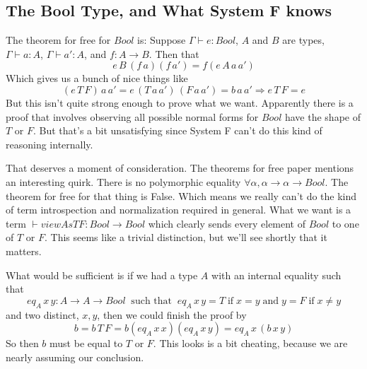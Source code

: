 \documentclass[12pt]{article}
\begin{document}
\subsection{The Bool Type, and What System F knows}
The theorem for free for $Bool$ is: Suppose $\Gamma \vdash e : Bool$, $A$ and $B$ are types, $\Gamma \vdash a : A$, $\Gamma \vdash a' : A$, and $f : A \rightarrow B$.
Then that 
\[
  e\, B\, (f\, a) (f\, a') = f (e\, A\, a\, a')
\]
Which gives us a bunch of nice things like
\[
(e\, T\, F)\, a\, a' = e\, (T\, a\, a')\, (F\, a\, a') = b\, a\, a' \Rightarrow e\, T\, F = e
\]
But this isn't quite strong enough to prove what we want.
Apparently there is a proof that involves observing all possible normal forms for $Bool$ have the shape of $T$ or $F$.
But that's a bit unsatisfying since System F can't do this kind of reasoning internally.

That deserves a moment of consideration.
The theorems for free paper mentions an interesting quirk.
There is no polymorphic equality $\forall \alpha, \alpha \rightarrow \alpha \rightarrow Bool$.
The theorem for free for that thing is False.
Which means we really can't do the kind of term introspection and normalization required in general. 
What we want is a term $\vdash viewAsTF : Bool \rightarrow Bool$ which clearly sends every element of $Bool$ to one of $T$ or $F$. 
This seems like a trivial distinction, but we'll see shortly that it matters.

What would be sufficient is if we had a type $A$ with an internal equality such that  
\[
  eq_A\, x\, y : A \rightarrow A \rightarrow Bool \;\;\text{such that}\;\; eq_A\, x\, y = T \;\text{if}\; x = y \;\text{and}\;  y = F \;\text{if}\; x \neq y
\]
and two distinct, $x, y$, then we could finish the proof by
\[
  b = b\, T\, F = b (eq_A\, x\, x) (eq_A\, x\, y) = eq_A\,x\, (b\, x\, y)
\]
So then $b$ must be equal to $T$ or $F$.
This looks is a bit cheating, because we are nearly assuming our conclusion.
\end{document}
